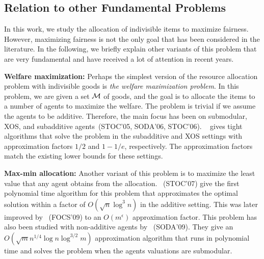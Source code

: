 {\subsection{Relation to other Fundamental Problems}
In this work, we study the allocation of indivisible items to maximize fairness. However, maximizing fairness is not the only goal that has been considered in the literature. In the following, we briefly explain other variants of this problem that are very fundamental and have received a lot of attention in recent years.

\textbf{Welfare maximization:} Perhaps the simplest version of the resource allocation problem with indivisible goods is \textit{the welfare maximization problem}. In this problem, we are given a set $\mathcal{M}$ of goods, and the goal is to allocate the items to a number of agents to maximize the welfare. The problem is trivial if we assume the agents to be additive. Therefore, the main focus has been on submodular, XOS, and subadditive agents~\cite{dobzinski2005approximation,dobzinski2006improved,feige2009maximizing,lehmann2001combinatorial}(STOC'05, SODA'06, STOC'06). \feigemaximizing~\cite{feige2009maximizing} gives tight algorithms that solve the problem in the subadditive and XOS settings with approximation factors $1/2$ and $1-1/e$, respectively. The approximation factors match the existing lower bounds for these settings.

\textbf{Max-min allocation:} Another variant of this problem is to maximize the least value that any agent obtains from the allocation.  \asadpourapproximation~\cite{asadpour2010approximation}(STOC'07) give the first polynomial time algorithm for this problem that approximates the optimal solution within a factor of $O(\sqrt{n}\log^3n)$ in the additive setting. This was later improved by \chakrabartyallocating~\cite{chakrabarty2009allocating}(FOCS'09) to an $O(m^\epsilon)$ approximation factor. This problem has also been studied with non-additive agents by \goemansapproximating~\cite{goemans2009approximating}(SODA'09). They give an $O(\sqrt{m}n^{1/4}\log n \log^{3/2}m)$ approximation algorithm that runs in polynomial time and solves the problem when the agents valuations are submodular.

}
